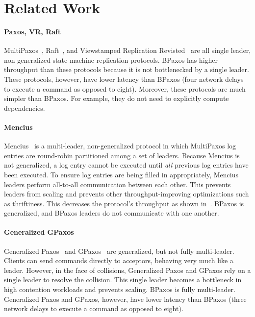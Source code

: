 \section{Related Work}

\paragraph{Paxos, VR, Raft}
MultiPaxos~\cite{lamport1998part, lamport2001paxos, van2015paxos,
lampson2001abcd, mazieres2007paxos}, Raft~\cite{mazieres2007paxos}, and
Viewstamped Replication Revisted~\cite{liskov2012viewstamped} are all single
leader, non-generalized state machine replication protocols. BPaxos has higher
throughput than these protocols because it is not bottlenecked by a single
leader. These protocols, however, have lower latency than BPaxos (four network
delays to execute a command as opposed to eight). Moreover, these protocols are
much simpler than BPaxos. For example, they do not need to explicitly compute
dependencies.

\paragraph{Mencius}
Mencius~\cite{mao2008mencius} is a multi-leader, non-generalized protocol in
which MultiPaxos log entries are round-robin partitioned among a set of
leaders. Because Mencius is not generalized, a log entry cannot be executed
until \emph{all} previous log entries have been executed. To ensure log entries
are being filled in appropriately, Mencius leaders perform all-to-all
communication between each other. This prevents leaders from scaling and
prevents other throughput-improving optimizations such as thriftiness. This
decreases the protocol's throughput as shown in~\cite{moraru2013proof}. BPaxos
is generalized, and BPaxos leaders do not communicate with one another.

\paragraph{Generalized GPaxos}
Generalized Paxos~\cite{lamport2005generalized} and GPaxos~\cite{sutra2011fast}
are generalized, but not fully multi-leader. Clients can send commands directly
to acceptors, behaving very much like a leader. However, in the face of
collisions, Generalized Paxos and GPaxos rely on a single leader to resolve the
collision. This single leader becomes a bottleneck in high contention workloads
and prevents scaling. BPaxos is fully multi-leader. Generalized Paxos and
GPaxos, however, have lower latency than BPaxos (three network delays to
execute a command as opposed to eight).

